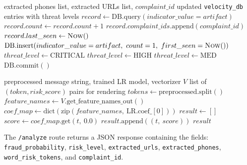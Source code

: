 \begin{algorithm}[h]
\caption{Velocity Intelligence Update}\label{alg:velocity}
\begin{algorithmic}[1]
\Require extracted phones list, extracted URLs list, $complaint\_id$
\Ensure updated \texttt{velocity\_db} entries with threat levels
    \State $record \gets \text{DB.query}(indicator\_value = artifact)$
        \State $record.count \gets record.count + 1$
        \State $record.complaint\_ids.\text{append}(complaint\_id)$
        \State $record.last\_seen \gets \textsc{Now}()$
    \Else
        \State $\text{DB.insert}(indicator\_value=artifact,\ count=1,\ first\_seen=\textsc{Now}())$
    \EndIf
        \State $threat\_level \gets \text{CRITICAL}$
        \State $threat\_level \gets \text{HIGH}$
    \Else
        \State $threat\_level \gets \text{MED}$
    \EndIf
    \State $\text{DB.commit}()$
\EndFor
\end{algorithmic}
\end{algorithm}

\begin{algorithm}[h]
\caption{Word Risk Heatmap Token Scoring}\label{alg:heatmap}
\begin{algorithmic}[1]
\Require preprocessed message string, trained LR model, vectorizer $V$
\Ensure list of $(token, risk\_score)$ pairs for rendering
\State $tokens \gets \text{preprocessed.split}()$
\State $feature\_names \gets V.\text{get\_feature\_names\_out}()$
\State $coef\_map \gets \text{dict}(\text{zip}(feature\_names,\ \text{LR.coef\_}[0]))$
\State $result \gets []$
    \State $score \gets coef\_map.\text{get}(t,\ 0.0)$
    \State $result.\text{append}((t,\ score))$
\EndFor
\State \Return $result$ 
\end{algorithmic}
\end{algorithm}

The \texttt{/analyze} route returns a JSON response containing the fields: \texttt{fraud\_probability}, \texttt{risk\_level}, \texttt{extracted\_urls}, \texttt{extracted\_phones}, \texttt{word\_risk\_tokens}, and \texttt{complaint\_id}.

